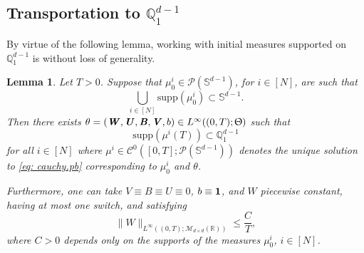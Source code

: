 \documentclass[a4paper,11pt]{article}
\theoremstyle{plain}
\newtheorem{lemma}[theorem]{Lemma}
\newcommand{\R}{\mathbb{R}}
\renewcommand{\S}{\mathbb{S}^{d-1}}
\newcommand{\bW}{\bm{\mathit{W}}}
\newcommand{\bV}{\bm{\mathit{V}}}
\newcommand{\bB}{\bm{\mathit{B}}}
\newcommand{\bU}{\bm{\mathit{U}}}
\renewcommand{\leq}{\leqslant}
\numberwithin{equation}{section}
\begin{document}
\subsection{\texorpdfstring{Transportation to $\mathbb{Q}_1^{d-1}$}{Transportation to}}


By virtue of the following lemma, working with initial measures supported on $\mathbb{Q}_1^{d-1}$ is without loss of generality.

\begin{lemma} \label{lem: first.quadrant}
Let $T>0$. Suppose that $\mu_0^i\in\mathscr{P}(\S)$, for $i\in[N]$, are such that 
\begin{equation*}
    \bigcup_{i\in[N]} \mathrm{supp}(\mu^i_0)\subset\S.
\end{equation*}
Then there exists $\theta=(\bW,\bU,\bB,\bV,b)\in L^\infty((0,T);\Uptheta)$ such that 
\begin{equation*}
\mathrm{supp}(\mu^i(T)) \subset \mathbb{Q}_1^{d-1}
\end{equation*}
for all $i\in[N]$ where $\mu^i\in \mathscr{C}^0([0,T];\mathscr{P}(\S))$ denotes the unique solution to \eqref{eq: cauchy.pb} corresponding to $\mu_0^i$ and $\theta$.

Furthermore, one can take $\bV\equiv\bB\equiv\bU\equiv0$, $b\equiv{\bf 1}$, and $\bW$ piecewise constant, having at most one switch, and satisfying
\begin{equation*}
\|\bW\|_{L^\infty((0,T);\mathscr{M}_{d\times d}(\R))}\leq \frac{C}{T},
\end{equation*}
where $C>0$ depends only on the supports of the measures $\mu_0^i$, $i\in[N]$.
\end{lemma}
\end{document}
